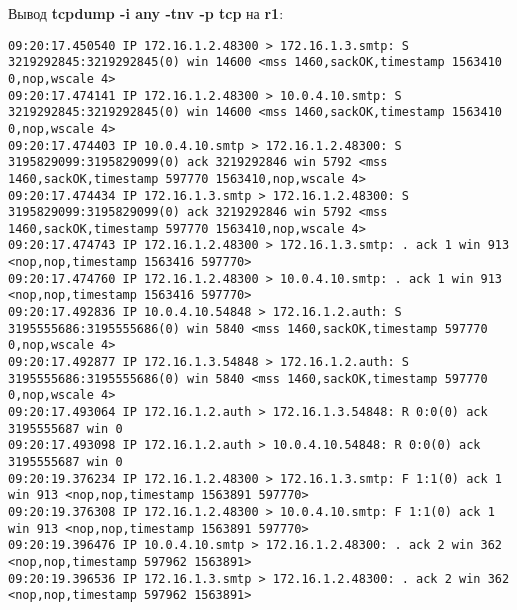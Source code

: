 \documentclass[a4paper,12pt]{article}
\begin{document}
Вывод \textbf{tcpdump -i any -tnv -p tcp} на \textbf{r1}:
\begin{Verbatim}
09:20:17.450540 IP 172.16.1.2.48300 > 172.16.1.3.smtp: S 3219292845:3219292845(0) win 14600 <mss 1460,sackOK,timestamp 1563410 0,nop,wscale 4>
09:20:17.474141 IP 172.16.1.2.48300 > 10.0.4.10.smtp: S 3219292845:3219292845(0) win 14600 <mss 1460,sackOK,timestamp 1563410 0,nop,wscale 4>
09:20:17.474403 IP 10.0.4.10.smtp > 172.16.1.2.48300: S 3195829099:3195829099(0) ack 3219292846 win 5792 <mss 1460,sackOK,timestamp 597770 1563410,nop,wscale 4>
09:20:17.474434 IP 172.16.1.3.smtp > 172.16.1.2.48300: S 3195829099:3195829099(0) ack 3219292846 win 5792 <mss 1460,sackOK,timestamp 597770 1563410,nop,wscale 4>
09:20:17.474743 IP 172.16.1.2.48300 > 172.16.1.3.smtp: . ack 1 win 913 <nop,nop,timestamp 1563416 597770>
09:20:17.474760 IP 172.16.1.2.48300 > 10.0.4.10.smtp: . ack 1 win 913 <nop,nop,timestamp 1563416 597770>
09:20:17.492836 IP 10.0.4.10.54848 > 172.16.1.2.auth: S 3195555686:3195555686(0) win 5840 <mss 1460,sackOK,timestamp 597770 0,nop,wscale 4>
09:20:17.492877 IP 172.16.1.3.54848 > 172.16.1.2.auth: S 3195555686:3195555686(0) win 5840 <mss 1460,sackOK,timestamp 597770 0,nop,wscale 4>
09:20:17.493064 IP 172.16.1.2.auth > 172.16.1.3.54848: R 0:0(0) ack 3195555687 win 0
09:20:17.493098 IP 172.16.1.2.auth > 10.0.4.10.54848: R 0:0(0) ack 3195555687 win 0
09:20:19.376234 IP 172.16.1.2.48300 > 172.16.1.3.smtp: F 1:1(0) ack 1 win 913 <nop,nop,timestamp 1563891 597770>
09:20:19.376308 IP 172.16.1.2.48300 > 10.0.4.10.smtp: F 1:1(0) ack 1 win 913 <nop,nop,timestamp 1563891 597770>
09:20:19.396476 IP 10.0.4.10.smtp > 172.16.1.2.48300: . ack 2 win 362 <nop,nop,timestamp 597962 1563891>
09:20:19.396536 IP 172.16.1.3.smtp > 172.16.1.2.48300: . ack 2 win 362 <nop,nop,timestamp 597962 1563891>
\end{Verbatim}
\end{document}

